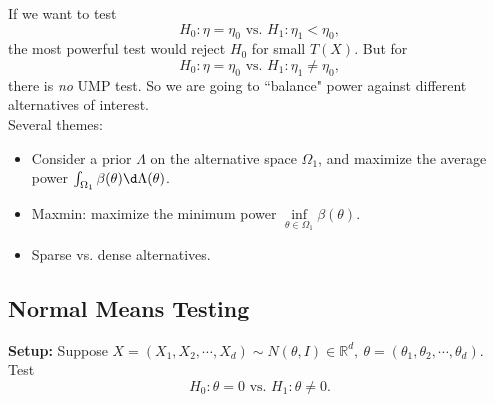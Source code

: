 \documentclass[a4paper]{article}
\begin{document}
\begin{remark}
	If we want to test
	\begin{equation*}
		H_0: \eta = \eta_0 \text{ vs. } H_1: \eta_1 < \eta_0,
	\end{equation*}
	the most powerful test would reject $H_0$ for small $T(X)$. But for
	\begin{equation*}
		H_0: \eta = \eta_0 \text{ vs. } H_1: \eta_1 \neq \eta_0,
	\end{equation*}
	there is \emph{no} UMP test. So we are going to ``balance" power against different alternatives of interest.\\
	\newline
	Several themes:
	\begin{itemize}
		\item Consider a prior $\Lambda$ on the alternative space $\Omega_1$, and maximize the  average power $\int_{\Omega_1} \beta(\theta) \d \Lambda(\theta)$.
		\item Maxmin: maximize the minimum power $\inf\limits_{\theta \in \Omega_1} \beta(\theta)$.
		\item Sparse vs. dense alternatives.
	\end{itemize}
\end{remark}

\subsection{Normal Means Testing}
\textbf{Setup:} Suppose $X = (X_1, X_2, \cdots, X_d) \sim N(\theta,I) \in \mathbb{R}^d, \ \theta = (\theta_1,\theta_2,\cdots,\theta_d)$. Test
\begin{equation*}
	H_0: \theta = 0 \text{ vs. } H_1: \theta \neq 0.
\end{equation*}
\end{document}
